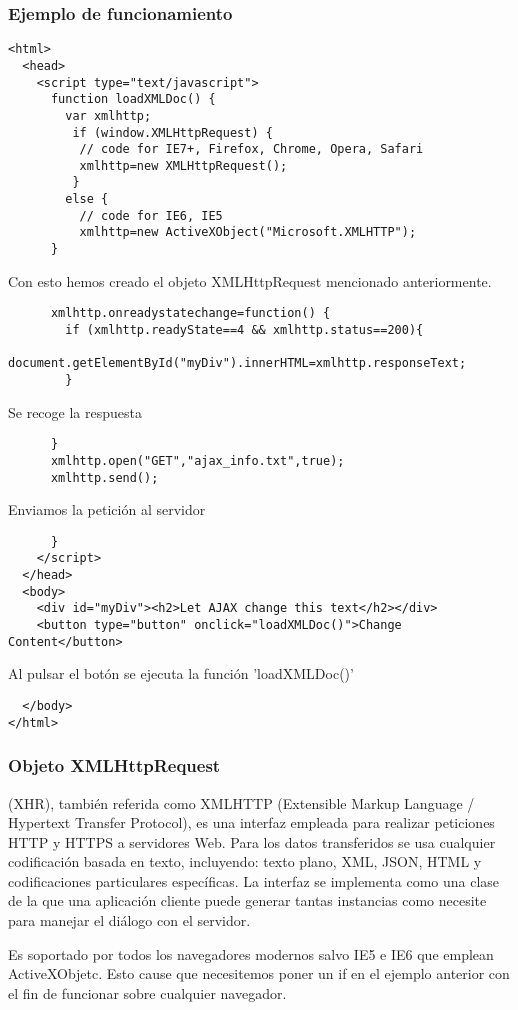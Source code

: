 \documentclass{apuntes}
\begin{document}
\subsubsection{Ejemplo de funcionamiento}
\small
\begin{verbatim}
<html>
  <head>
    <script type="text/javascript">
      function loadXMLDoc() {
        var xmlhttp;
         if (window.XMLHttpRequest) {
          // code for IE7+, Firefox, Chrome, Opera, Safari
          xmlhttp=new XMLHttpRequest();
         }
        else {
          // code for IE6, IE5
          xmlhttp=new ActiveXObject("Microsoft.XMLHTTP");
      }
\end{verbatim}
\normalsize
Con esto hemos creado el objeto XMLHttpRequest mencionado anteriormente.
\small
\begin{verbatim}
      xmlhttp.onreadystatechange=function() {
        if (xmlhttp.readyState==4 && xmlhttp.status==200){
          document.getElementById("myDiv").innerHTML=xmlhttp.responseText;
        }
\end{verbatim}
\normalsize
Se recoge la respuesta
\small
\begin{verbatim}
      }
      xmlhttp.open("GET","ajax_info.txt",true);
      xmlhttp.send();
\end{verbatim}
\normalsize
Enviamos la petición al servidor
\small
\begin{verbatim}
      }
    </script>
  </head>
  <body>
    <div id="myDiv"><h2>Let AJAX change this text</h2></div>
    <button type="button" onclick="loadXMLDoc()">Change Content</button>
\end{verbatim}
\normalsize
Al pulsar el botón se ejecuta la función 'loadXMLDoc()'
\small
\begin{verbatim}
  </body>
</html>
\end{verbatim}
\newpage
\subsubsection{Objeto XMLHttpRequest}
\begin{defn}
(XHR), también referida como XMLHTTP (Extensible Markup Language / Hypertext Transfer Protocol), es una interfaz empleada para realizar peticiones HTTP y HTTPS a servidores Web. Para los datos transferidos se usa cualquier codificación basada en texto, incluyendo: texto plano, XML, JSON, HTML y codificaciones particulares específicas. La interfaz se implementa como una clase de la que una aplicación cliente puede generar tantas instancias como necesite para manejar el diálogo con el servidor.
\end{defn}
Es soportado por todos los navegadores modernos salvo IE5 e IE6 que emplean ActiveXObjetc. Esto cause que necesitemos poner un if en el ejemplo anterior con el fin de funcionar sobre cualquier navegador.
\end{document}
